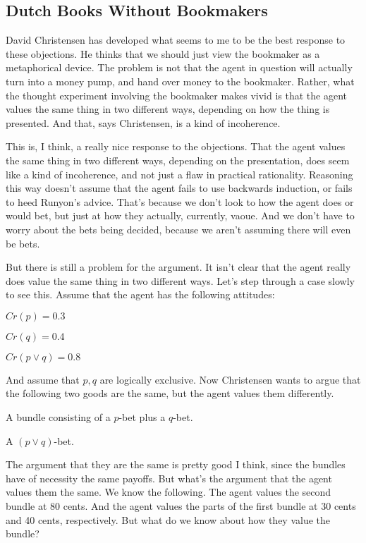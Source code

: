 \subsection{Dutch Books Without Bookmakers}

David Christensen has developed what seems to me to be the best response to these objections. He thinks that we should just view the bookmaker as a metaphorical device. The problem is not that the agent in question will actually turn into a money pump, and hand over money to the bookmaker. Rather, what the thought experiment involving the bookmaker makes vivid is that the agent values the same thing in two different ways, depending on how the thing is presented. And that, says Christensen, is a kind of incoherence.

This is, I think, a really nice response to the objections. That the agent values the same thing in two different ways, depending on the presentation, does seem like a kind of incoherence, and not just a flaw in practical rationality. Reasoning this way doesn't assume that the agent fails to use backwards induction, or fails to heed Runyon's advice. That's because we don't look to how the agent does or would bet, but just at how they actually, currently, vaoue. And we don't have to worry about the bets being decided, because we aren't assuming there will even be bets.

But there is still a problem for the argument. It isn't clear that the agent really does value the same thing in two different ways. Let's step through a case slowly to see this. Assume that the agent has the following attitudes:

\begin{itemize*}
\item $Cr(p) = 0.3$
\item $Cr(q) = 0.4$
\item $Cr(p \vee q) = 0.8$
\end{itemize*}
And assume that $p, q$ are logically exclusive. Now Christensen wants to argue that the following two goods are the same, but the agent values them differently.

\begin{enumerate*}
\item A bundle consisting of a $p$-bet plus a $q$-bet.
\item A $(p \vee q)$-bet.
\end{enumerate*}
The argument that they are the same is pretty good I think, since the bundles have of necessity the same payoffs. But what's the argument that the agent values them the same. We know the following. The agent values the second bundle at 80 cents. And the agent values the parts of the first bundle at 30 cents and 40 cents, respectively. But what do we know about how they value the bundle?


